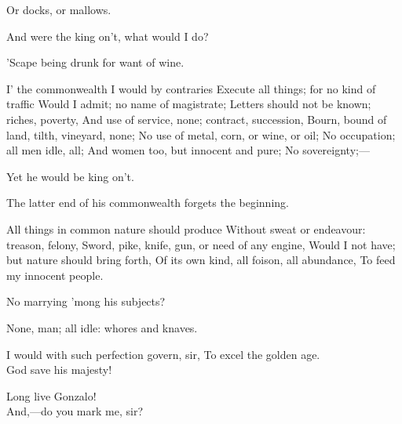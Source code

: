 \documentclass[11pt]{book}
\begin{document}
\8	Or docks, or mallows.

\9	And were the king on't, what would I do?

\8	'Scape being drunk for want of wine.

\9	I' the commonwealth I would by contraries
	Execute all things; for no kind of traffic
	Would I admit; no name of magistrate;
	Letters should not be known; riches, poverty,
	And use of service, none; contract, succession,
	Bourn, bound of land, tilth, vineyard, none;
	No use of metal, corn, or wine, or oil;
	No occupation; all men idle, all;
	And women too, but innocent and pure;
	No sovereignty;---

\begin{PROSE}

\8	                  Yet he would be king on't.

\7	The latter end of his commonwealth forgets the
	beginning.

\end{PROSE}

\9	All things in common nature should produce
	Without sweat or endeavour: treason, felony,
	Sword, pike, knife, gun, or need of any engine,
	Would I not have; but nature should bring forth,
	Of its own kind, all foison, all abundance,
	To feed my innocent people.

\begin{PROSE}

\8	No marrying 'mong his subjects?

\7	None, man; all idle: whores and knaves.

\end{PROSE}

\9	I would with such perfection govern, sir,
	To excel the golden age. \\

\8	God save his majesty!

\7	Long live Gonzalo! \\

\9	                  And,---do you mark me, sir?
\end{document}
